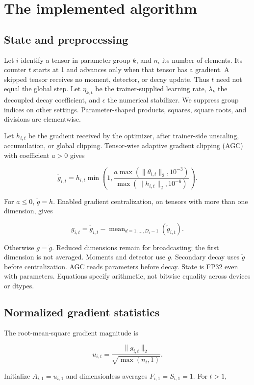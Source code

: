 \documentclass[11pt,a4paper]{article}
\begin{document}
\section{The implemented algorithm}

\subsection{State and preprocessing}

Let $i$ identify a tensor in parameter group $k$, and $n_i$ its number of elements. Its counter $t$ starts at 1 and advances only when that tensor has a gradient. A skipped tensor receives no moment, detector, or decay update. Thus $t$ need not equal the global step. Let $\eta_{k,t}$ be the trainer-supplied learning rate, $\lambda_k$ the decoupled decay coefficient, and $\epsilon$ the numerical stabilizer. We suppress group indices on other settings. Parameter-shaped products, squares, square roots, and divisions are elementwise.

Let $h_{i,t}$ be the gradient received by the optimizer, after trainer-side unscaling, accumulation, or global clipping. Tensor-wise adaptive gradient clipping (AGC) with coefficient $a>0$ gives

\[
\widetilde g_{i,t}=h_{i,t}\min\left(1,\frac{a\max(\|\theta_{i,t}\|_2,10^{-3})}{\max(\|h_{i,t}\|_2,10^{-6})}\right).
\]

For $a\leq0$, $\widetilde g=h$. Enabled gradient centralization, on tensors with more than one dimension, gives

\[
g_{i,t}=\widetilde g_{i,t}-\operatorname{mean}_{d=1,\ldots,D_i-1}(\widetilde g_{i,t}).
\]

Otherwise $g=\widetilde g$. Reduced dimensions remain for broadcasting; the first dimension is not averaged. Moments and detector use $g$. Secondary decay uses $\widetilde g$ before centralization. AGC reads parameters before decay. State is FP32 even with  parameters. Equations specify arithmetic, not bitwise equality across devices or dtypes.

\subsection{Normalized gradient statistics}

The root-mean-square gradient magnitude is

\[
u_{i,t}=\frac{\|g_{i,t}\|_2}{\sqrt{\max(n_i,1)}}.
\]

Initialize $A_{i,1}=u_{i,1}$ and dimensionless averages $F_{i,1}=S_{i,1}=1$. For $t>1$,
\end{document}
